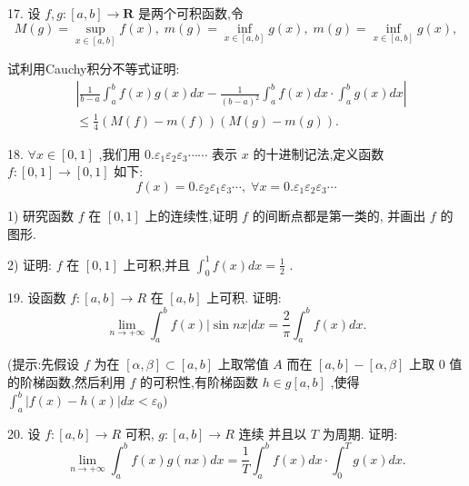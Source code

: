 17. 设 $f,g : \left\lbrack  {a,b}\right\rbrack   \rightarrow  \mathbf{R}$ 是两个可积函数,令
$$M\left( g\right)  = \mathop{\sup }\limits_{{x \in  \left\lbrack  {a,b}\right\rbrack  }}f\left( x\right) ,\;m\left( g\right)  = \mathop{\inf }\limits_{{x \in  \left\lbrack  {a,b}\right\rbrack  }}g\left( x\right) ,\;m\left( g\right)  = \mathop{\inf }\limits_{{x \in  \left\lbrack  {a,b}\right\rbrack  }}g\left( x\right) ,$$

试利用Cauchy积分不等式证明:
\begin{align*}
	&\left| {\frac{1}{b - a}{\int }_{a}^{b}f\left( x\right) g\left( x\right) {dx} - \frac{1}{{\left( b - a\right) }^{2}}{\int }_{a}^{b}f\left( x\right) {dx} \cdot  {\int }_{a}^{b}g\left( x\right) {dx}}\right|\\
	&\leq  \frac{1}{4}\left( {M\left( f\right)  - m\left( f\right) }\right) \left( {M\left( g\right)  - m\left( g\right) }\right) .
\end{align*}

18. $\forall x \in  \left\lbrack  {0,1}\right\rbrack$ ,我们用 $0.{\varepsilon }_{1}{\varepsilon }_{2}{\varepsilon }_{3}\cdots \cdots$ 表示 $x$ 的十进制记法,定义函数 $f : \left\lbrack  {0,1}\right\rbrack   \rightarrow  \left\lbrack  {0,1}\right\rbrack$ 如下:
$$f\left( x\right)  = 0.{\varepsilon }_{2}{\varepsilon }_{1}{\varepsilon }_{3}\cdots ,\;\forall x = 0.{\varepsilon }_{1}{\varepsilon }_{2}{\varepsilon }_{3}\cdots$$

1) 研究函数 $f$ 在 $\left\lbrack  {0,1}\right\rbrack$ 上的连续性,证明 $f$ 的间断点都是第一类的, 并画出 $f$ 的图形.

2) 证明: $f$ 在 $\left\lbrack  {0,1}\right\rbrack$ 上可积,并且 ${\int }_{0}^{1}f\left( x\right) {dx} = \frac{1}{2}$ .

19. 设函数 $f : \left\lbrack  {a,b}\right\rbrack   \rightarrow  R$ 在 $\left\lbrack  {a,b}\right\rbrack$ 上可积. 证明:
$$\mathop{\lim }\limits_{{n \rightarrow   + \infty }}{\int }_{a}^{b}f\left( x\right) \left| {\sin {nx}}\right| {dx} = \frac{2}{\pi }{\int }_{a}^{b}f\left( x\right) {dx}.$$

(提示:先假设 $f$ 为在 $\left\lbrack  {\alpha ,\beta }\right\rbrack   \subset  \left\lbrack  {a,b}\right\rbrack$ 上取常值 $A$ 而在 $\left\lbrack  {a,b}\right\rbrack   - \left\lbrack  {\alpha ,\beta }\right\rbrack$ 上取 0 值的阶梯函数,然后利用 $f$ 的可积性,有阶梯函数 $h \in  g\left\lbrack  {a,b}\right\rbrack$ ,使得 ${\int }_{a}^{b}\left| {f\left( x\right)  - h\left( x\right) }\right| {dx} < {\varepsilon }_{0})$

20. 设 $f : \left\lbrack  {a,b}\right\rbrack   \rightarrow  R$ 可积, $g : \left\lbrack  {a,b}\right\rbrack   \rightarrow  R$ 连续 并且以 $T$ 为周期. 证明:
$$\mathop{\lim }\limits_{{n \rightarrow   + \infty }}{\int }_{a}^{b}f\left( x\right) g\left( {nx}\right) {dx} = \frac{1}{T}{\int }_{a}^{b}f\left( x\right) {dx} \cdot  {\int }_{0}^{T}g\left( x\right) {dx}.$$

